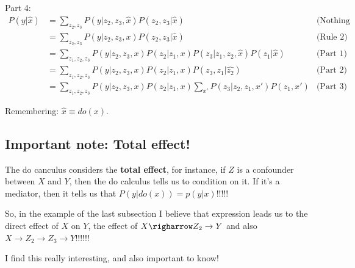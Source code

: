 Part 4:
\begin{align*}
P(y|\hat{x})&=\sum\limits_{z_2,z_3}P(y|z_2,z_3,\hat{x})P(z_2,z_3|\hat{x})&\text{(Nothing special here)}\\
&=\sum\limits_{z_2,z_3}P(y|z_2,z_3,x)P(z_2,z_3|\hat{x})&\text{(Rule 2)}\\
&=\sum\limits_{z_1,z_2,z_3}P(y|z_2,z_3,x)P(z_2|z_1,x)P(z_3|z_1,z_2,\hat{x})P(z_1|\hat{x})&\text{(Part 1)}\\
&=\sum\limits_{z_1,z_2,z_3}P(y|z_2,z_3,x)P(z_2|z_1,x)P(z_3,z_1|\hat{z_2})&\text{(Part 2)}\\
&=\sum\limits_{z_1,z_2,z_3}P(y|z_2,z_3,x)P(z_2|z_1,x)\sum\limits_{x'}P(z_3|z_2,z_1,x')P(z_1,x')&\text{(Part 3)}
\end{align*}

Remembering: $\hat{x} \equiv do(x)$.

\subsection{Important note: Total effect!}

The do canculus considers the \textbf{total effect}, for instance, if $Z$ is a confounder between $X$ and $Y$, then the do calculus tells us to condition on it. If it's a mediator, then it tells us that $P(y|do(x)) = p(y|x)$!!!!!

So, in the example of the last subsection I believe that expression leads us to the direct effect of $X$ on $Y$, the effect of $X \righarrow Z_2 \rightarrow Y$ and also $X\rightarrow Z_2 \rightarrow Z_3 \rightarrow Y$!!!!!! 

I find this really interesting, and also important to know!
